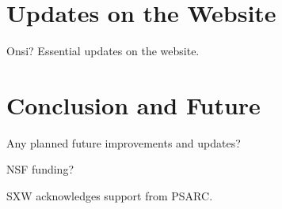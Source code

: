 \documentclass[11pt,preprint]{aastex}
\begin{document}
\begin{CJK*}{UTF8}{gbsn}
\section{Updates on the Website}\label{sec:website}

Onsi? Essential updates on the website.


\section{Conclusion and Future}\label{sec:conclusion}

Any planned future improvements and updates?


\acknowledgments

NSF funding?

SXW acknowledges support from PSARC.





\clearpage


\end{CJK*}
\end{document}
